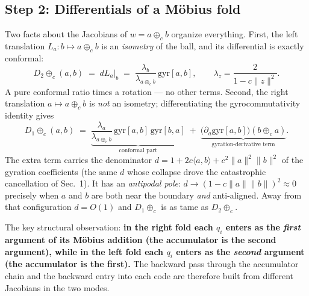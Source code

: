 \documentclass{article}
\begin{document}
\subsection*{Step 2: Differentials of a M\"obius fold}
Two facts about the Jacobians of $w = a \oplus_c b$ organize everything. First, the left translation $L_a : b \mapsto a \oplus_c b$ is an \emph{isometry} of the ball, and its differential is exactly conformal:
\begin{equation}\label{eq:dL}
    D_2 \oplus_c (a, b) \;=\; dL_a\big|_b \;=\; \frac{\lambda_b}{\lambda_{a \oplus_c b}}\, \text{gyr}[a, b],
    \qquad \lambda_z = \frac{2}{1 - c\|z\|^2}.
\end{equation}
A pure conformal ratio times a rotation --- no other terms. Second, the right translation $a \mapsto a \oplus_c b$ is \emph{not} an isometry; differentiating the gyrocommutativity identity gives
\begin{equation}\label{eq:dR}
    D_1 \oplus_c (a, b) \;=\; \underbrace{\frac{\lambda_a}{\lambda_{a \oplus_c b}}\, \text{gyr}[a,b]\,\text{gyr}[b,a]}_{\text{conformal part}} \;+\; \underbrace{\big(\partial_a \text{gyr}[a, b]\big)(b \oplus_c a)}_{\text{gyration-derivative term}} .
\end{equation}
The extra term carries the denominator $d = 1 + 2c\langle a, b\rangle + c^2 \|a\|^2 \|b\|^2$ of the gyration coefficients (the same $d$ whose collapse drove the catastrophic cancellation of Sec.~1). It has an \emph{antipodal pole}: $d \to (1 - c\|a\|\|b\|)^2 \approx 0$ precisely when $a$ and $b$ are both near the boundary \emph{and} anti-aligned. Away from that configuration $d = O(1)$ and $D_1 \oplus_c$ is as tame as $D_2 \oplus_c$.

The key structural observation: \textbf{in the right fold each $q_i$ enters as the \emph{first} argument of its M\"obius addition (the accumulator is the second argument), while in the left fold each $q_i$ enters as the \emph{second} argument (the accumulator is the first).} The backward pass through the accumulator chain and the backward entry into each code are therefore built from different Jacobians in the two modes.
\end{document}
